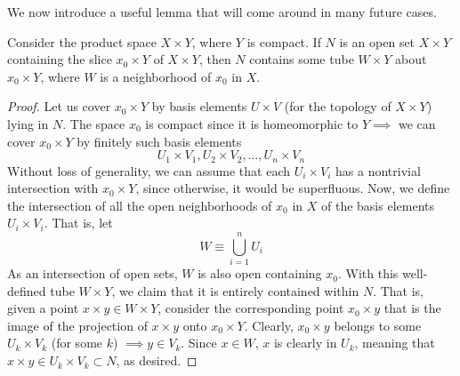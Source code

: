   We now introduce a useful lemma that will come around in many future cases. 

  \begin{lemma}
    Consider the product space $X \times Y$, where $Y$ is compact. If $N$ is an open set $X \times Y$ containing the slice $x_0 \times Y$ of $X \times Y$, then $N$ contains some tube $W \times Y$ about $x_0 \times Y$, where $W$ is a neighborhood of $x_0$ in $X$. 

    \begin{figure}[H]
      \centering 
      \label{fig:tube_lemma}
    \end{figure}
  \end{lemma}
  \begin{proof}
    Let us cover $x_0 \times Y$ by basis elements $U \times V$ (for the topology of $X \times Y$) lying in $N$. The space $x_0$ is compact since it is homeomorphic to $Y \implies$ we can cover $x_0 \times Y$ by finitely such basis elements
    \begin{equation}
      U_1 \times V_1, U_2 \times V_2, \ldots , U_n \times V_n
    \end{equation}
    Without loss of generality, we can assume that each $U_i \times V_i$ has a nontrivial intersection with $x_0 \times Y$, since otherwise, it would be superfluous. Now, we define the intersection of all the open neighborhoods of $x_0$ in $X$ of the basis elements $U_i \times V_i$. That is, let
    \begin{equation}
      W \equiv \bigcup_{i=1}^n U_i
    \end{equation}
    As an intersection of open sets, $W$ is also open containing $x_0$. With this well-defined tube $W \times Y$, we claim that it is entirely contained within $N$. That is, given a point $x \times y \in W \times Y$, consider the corresponding point $x_0 \times y$ that is the image of the projection of $x\times y$ onto $x_0 \times Y$. Clearly, $x_0 \times y$ belongs to some $U_k \times V_k$ (for some $k$) $\implies y \in V_k$. Since $x \in W$, $x$ is clearly in $U_k$, meaning that $x \times y \in U_k \times V_k \subset N$, as desired. 
  \end{proof}

